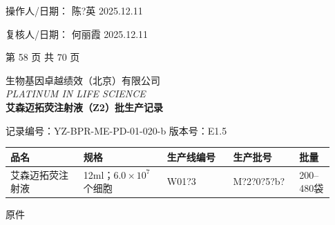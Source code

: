 \documentclass[UTF8,10pt,a4paper,fontset=fandol]{ctexart}
\newcommand{\fieldvalue}[1]{#1}
\newcommand{\handwritten}[1]{#1}
\begin{document}
\vspace{0.5em}

\noindent
操作人/日期：
\fieldvalue{\handwritten{陈?英}}
\quad
\fieldvalue{\handwritten{2025.12.11}}

\hfill
复核人/日期：
\fieldvalue{\handwritten{何丽霞}}
\quad
\fieldvalue{\handwritten{2025.12.11}}

\vfill

\begin{center}
第 58 页 共 70 页
\end{center}

\newpage

\begin{center}
{\small 生物基因卓越绩效（北京）有限公司}\\
{\small \textit{PLATINUM IN LIFE SCIENCE}}\\[2pt]
\textbf{艾森迈拓荧注射液（Z2）批生产记录}
\end{center}

\noindent
记录编号：YZ-BPR-ME-PD-01-020-b\hfill
版本号：E1.5

\begin{center}
\begin{tabular}{|p{0.21\linewidth}|p{0.24\linewidth}|p{0.19\linewidth}|p{0.19\linewidth}|p{0.10\linewidth}|}
\hline
品名 & 规格 & 生产线编号 & 生产批号 & 批量\\
\hline
艾森迈拓荧注射液 &
12ml；$6.0\times10^{7}$个细胞 &
\fieldvalue{\handwritten{W01?3}} &
\fieldvalue{\handwritten{M?2?0?5?b?}} &
200--480袋\\
\hline
\end{tabular}
\end{center}

\noindent
\fieldvalue{\handwritten{原件}}
\end{document}
